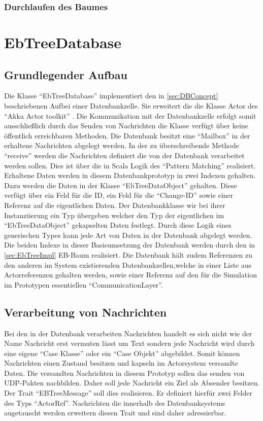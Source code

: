 \documentclass[a4paper,11pt,oneside,%
headsepline,												%
footsepline,												%
bibtotocnumbered									%
]{scrreprt}
\begin{document}
\subsubsection{Durchlaufen des Baumes}




\section{EbTreeDatabase}
\subsection{Grundlegender Aufbau}
Die Klasse \enquote{EbTreeDatabase} implementiert den in \autoref{sec:DBConcept} beschriebenen Aufbei einer Datenbankzelle. Sie erweitert die die Klasse Actor des \enquote{Akka Actor toolkit} \autocite{Akka}. Die Kommunikation mit der Datenbankzelle erfolgt somit ausschließlich durch das Senden von Nachrichten die Klasse verfügt über keine öffentlich erreichbaren Methoden. Die Datenbank besitzt eine \enquote{Mailbox} in der erhaltene Nachrichten abgelegt werden. In der zu überschreibende Methode \enquote{receive} werden die Nachrichten definiert die von der Datenbank verarbeitet werden sollen. Dies ist über die in Scala Logik des \enquote{Pattern Matching} realisiert. Erhaltene Daten werden in diesem Datenbankprototyp in zwei Indexen gehalten. Dazu werden die Daten in der Klasse \enquote{EbTreeDataObject} gehalten. Diese verfügt über ein Feld für die \ac{ID}, ein Feld für die \enquote{Change-ID} sowie einer Referenz auf die eigentlichen Daten. Der Datenbankklasse wir bei ihrer Instanziierung ein Typ übergeben welcher den Typ der eigentlichen im  \enquote{EbTreeDataObject} gekapselten Daten festlegt. Durch diese Logik eines generischen Types kann jede Art von Daten in der Datenbank abgelegt werden. Die beiden Indexe in dieser Basisumsetzung der Datenbank werden durch den in \autoref{sec:EbTreeImpl}
\ac{EB-Baum} realisiert. Die Datenbank hält zudem Referenzen zu den anderen im System existierenden Datenbankzellen,welche in einer Liste aus Actorreferenzen gehalten werden, sowie einer Referenz auf den für die Simulation im Prototypen essentiellen \enquote{CommunicationLayer}.\\

\subsection{Verarbeitung von Nachrichten}
Bei den in der Datenbank verarbeiten Nachrichten handelt es sich nicht wie der Name Nachricht erst vermuten lässt um Text sondern jede Nachricht wird durch eine eigene \enquote{Case Klasse} oder ein \enquote{Case Objekt} abgebildet. Somit können Nachrichten einen Zustand besitzen und kapseln im Actorsystem versandte Daten. Die versandten Nachrichten in diesem Prototyp sollen das senden von UDP-Pakten nachbilden. Daher soll jede Nachricht ein Ziel als Absender besitzen. Der Trait \enquote{EBTreeMessage} soll dies realisieren. Er definiert hierfür zwei Felder des Typs \enquote{ActorRef}. Nachrichten die innerhalb des Datenbanksystems augetauscht werden erweitern diesen Trait und sind daher adressierbar.
\end{document}
